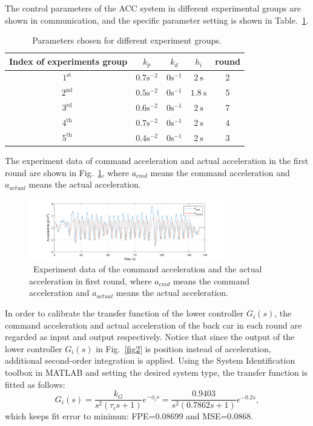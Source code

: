 \documentclass[journal]{IEEEtran}
\begin{document}
The control parameters of the ACC system in different experimental groups are shown in communication, and the specific parameter setting is shown in Table.~\ref{table 2}.
\begin{table}
  \caption{~Parameters chosen for different experiment groups.}
  \begin{tabular}{ccccc}
    \hline Index of experiments group & $k_{p}$               & $k_{d}$              & $h_{i}$           & round \\
    \hline $1^{\text {st }}$          & $0.7 \mathrm{s}^{-2}$ & $0  \mathrm{s}^{-1}$ & $2 \mathrm{~s}$   & 2     \\
    \hline $2^{\text {nd }}$          & $0.5 \mathrm{s}^{-2}$ & $0  \mathrm{s}^{-1}$ & $1.8 \mathrm{~s}$ & 5     \\
    \hline $3^{\text {rd }}$          & $0.6 \mathrm{s}^{-2}$ & $0  \mathrm{s}^{-1}$ & $2 \mathrm{~s}$   & 7     \\
    \hline $4^{\text {th }}$          & $0.7 \mathrm{s}^{-2}$ & $0  \mathrm{s}^{-1}$ & $2 \mathrm{~s}$   & 4     \\
    \hline $5^{\text {th }}$          & $0.4 \mathrm{s}^{-2}$ & $0  \mathrm{s}^{-1}$ & $2 \mathrm{~s}$   & 3     \\
    \hline
  \end{tabular}
  \label{table 2}
\end{table}

The experiment data of command acceleration and actual acceleration in the first round are shown in Fig.~\ref{fig14}, where $a_{cmd}$ means the command acceleration and $a_{actual}$ means the actual acceleration.

\begin{figure}
  \centering
  \includegraphics[width=8.5cm]{figs/fig14.png}
  \caption{~Experiment data of the command acceleration and the actual acceleration in first round, where $a_{cmd}$ means the command acceleration and $a_{actual}$ means the actual acceleration.}
  \label{fig14}
\end{figure}

In order to calibrate the transfer function of the lower controller $G_i (s)$, the command acceleration and actual acceleration of the back car in each round are regarded as input and output respectively. Notice that since the output of the lower controller $G_i (s)$ in Fig.~\ref{fig2} is position instead of acceleration, additional second-order integration is applied. Using the System Identification toolbox in MATLAB and setting the desired system type, the transfer function is fitted as follows:
\begin{equation}
  G_{i}(s)=\frac{k_{G}}{s^{2}\left(\tau_{i} s+1\right)} e^{-\phi_{i} s}=\frac{0.9403}{s^{2}(0.7862 s+1)} e^{-0.2 s},
\end{equation}
which keeps fit error to minimun: FPE=0.08699 and MSE=0.0868.
\end{document}
